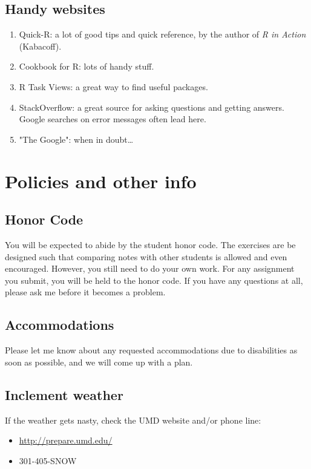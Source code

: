\documentclass{tufte-handout}
\begin{document}
\subsection*{Handy websites}
\label{sec:orgheadline14}
\begin{enumerate}
\item Quick-R: a lot of good tips and quick reference, by the author of \emph{R in Action} (Kabacoff).
\item Cookbook for R: lots of handy stuff.
\item R Task Views: a great way to find useful packages.
\item StackOverflow: a great source for asking questions and getting answers.  Google searches on error messages often lead here.
\item "The Google": when in doubt\ldots{}
\end{enumerate}
\section*{Policies and other info}
\label{sec:orgheadline19}
\subsection*{Honor Code}
\label{sec:orgheadline16}
You will be expected to abide by the student honor code. The exercises are be designed such that comparing notes with other students is allowed and even encouraged.  However, you still need to do your own work.  For any assignment you submit, you will be held to the honor code. If you have any questions at all, please ask me before it becomes a problem.
\subsection*{Accommodations}
\label{sec:orgheadline17}
Please let me know about any requested accommodations due to disabilities as soon as possible, and we will come up with a plan.
\subsection*{Inclement weather}
\label{sec:orgheadline18}
If the weather gets nasty, check the UMD website and/or phone line:
\begin{itemize}
\item \url{http://prepare.umd.edu/}
\item 301-405-SNOW
\end{itemize}
\end{document}
